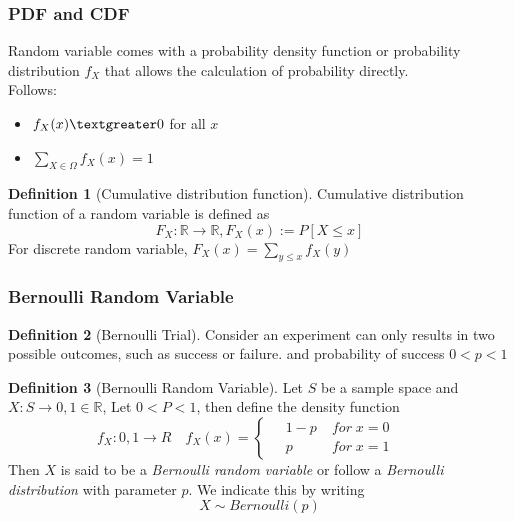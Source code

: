 \documentclass{article}
\theoremstyle{definition}
\newtheorem{definition}{Definition}[subsection]
\begin{document}
\subsubsection{PDF and CDF}
Random variable comes with a probability density function or probability distribution $f_X$ that allows the calculation of probability directly.\\
Follows:
\begin{itemize}
    \item $f_X(x)\textgreater 0$ for all $x$
    \item $\sum_{X\in \Omega} f_X(x)=1$ 
\end{itemize}
\begin{definition}[Cumulative distribution function]
    Cumulative distribution function of a random variable is defined as 
    \begin{equation}
        F_X:\mathbb{R}\rightarrow \mathbb{R}, F_X(x):=P[X\leq x]
    \end{equation}
    For discrete random variable, $F_X(x) = \sum_{y\leq x} f_X(y) $
\end{definition}
\subsubsection{Bernoulli Random Variable}
\begin{definition}[Bernoulli Trial]    
Consider an experiment can only results in two possible outcomes, such as success or failure.
and probability of success $0<p<1$
\end{definition}
\begin{definition}[Bernoulli Random Variable]
    Let $S$ be a sample space and $X:S\rightarrow {0,1}\in \mathbb{R}$, Let $0<P<1$, then define the density function
    \begin{equation}
        f_X:{0,1}\rightarrow R \quad f_X(x)=\left \{
            \begin{aligned}
                &\;1-p\; &for\; x=0\qquad \\
                &\;p  & for\;x=1\qquad
            \end{aligned}
    \end{equation}
    Then $X$ is said to be a \emph{Bernoulli random variable} or follow a \emph{Bernoulli distribution} with parameter $p$.
    We indicate this by writing
    \begin{equation}
        X \sim Bernoulli(p)
    \end{equation}
\end{definition}
\end{document}
